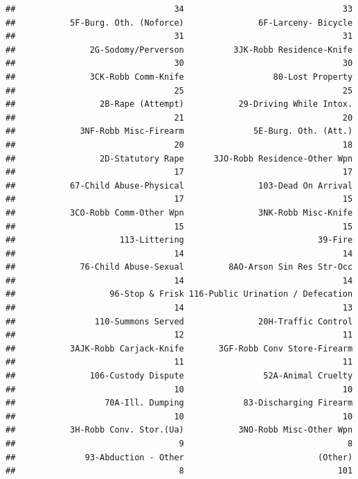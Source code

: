 \documentclass[12pt,]{book}
\theoremstyle{definition}
\theoremstyle{definition}
\theoremstyle{remark}
\begin{document}
\begin{verbatim}
##                                34                                33 
##           5F-Burg. Oth. (Noforce)               6F-Larceny- Bicycle 
##                                31                                31 
##               2G-Sodomy/Perverson          3JK-Robb Residence-Knife 
##                                30                                30 
##               3CK-Robb Comm-Knife                  80-Lost Property 
##                                25                                25 
##                 2B-Rape (Attempt)           29-Driving While Intox. 
##                                21                                20 
##             3NF-Robb Misc-Firearm              5E-Burg. Oth. (Att.) 
##                                20                                18 
##                 2D-Statutory Rape      3JO-Robb Residence-Other Wpn 
##                                17                                17 
##           67-Child Abuse-Physical               103-Dead On Arrival 
##                                17                                15 
##           3CO-Robb Comm-Other Wpn               3NK-Robb Misc-Knife 
##                                15                                15 
##                     113-Littering                           39-Fire 
##                                14                                14 
##             76-Child Abuse-Sexual         8AO-Arson Sin Res Str-Occ 
##                                14                                14 
##                   96-Stop & Frisk 116-Public Urination / Defecation 
##                                14                                13 
##                110-Summons Served               20H-Traffic Control 
##                                12                                11 
##           3AJK-Robb Carjack-Knife       3GF-Robb Conv Store-Firearm 
##                                11                                11 
##               106-Custody Dispute                52A-Animal Cruelty 
##                                10                                10 
##                  70A-Ill. Dumping            83-Discharging Firearm 
##                                10                                10 
##           3H-Robb Conv. Stor.(Ua)           3NO-Robb Misc-Other Wpn 
##                                 9                                 8 
##              93-Abduction - Other                           (Other) 
##                                 8                               101
\end{verbatim}
\end{document}
